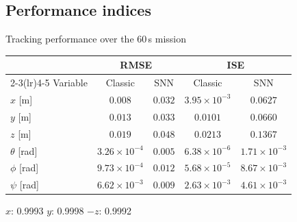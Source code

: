 \documentclass{beamer}
\begin{document}
\subsection{Performance indices}
\begin{frame}{Tracking performance over the 60\,s mission}
\begin{table}[h!]
\centering
\small
\begin{tabular}{lcccc}
\toprule
 & \multicolumn{2}{c}{RMSE} & \multicolumn{2}{c}{ISE} \\
\cmidrule(lr){2-3}\cmidrule(lr){4-5}
Variable & Classic & SNN & Classic & SNN \\
\midrule
$x$ [m]        & $0.008$ & $0.032$ & $3.95 \times 10^{-3}$ & $0.0627$ \\
$y$ [m]        & $0.013$ & $0.033$ & $0.0101$ & $0.0660$ \\
$z$ [m]        & $0.019$ & $0.048$ & $0.0213$ & $0.1367$ \\
$\theta$ [rad] & $3.26 \times 10^{-4}$ & $0.005$ & $6.38 \times 10^{-6}$ & $1.71 \times 10^{-3}$ \\
$\phi$ [rad]   & $9.73 \times 10^{-4}$ & $0.012$ & $5.68 \times 10^{-5}$ & $8.67 \times 10^{-3}$ \\
$\psi$ [rad]   & $6.62 \times 10^{-3}$ & $0.009$ & $2.63 \times 10^{-3}$ & $4.61 \times 10^{-3}$ \\
\bottomrule
\end{tabular}
\end{table}
\begin{tcolorbox}[colback = morado!10, colframe = morado!80, title = SNN vs.\ classic correlation $\rho_{\mathrm{SNN,cls}}$]
\centering
$x$: 0.9993 \qquad $y$: 0.9998 \qquad $-z$: 0.9992
\end{tcolorbox}
\end{frame}
\end{document}
